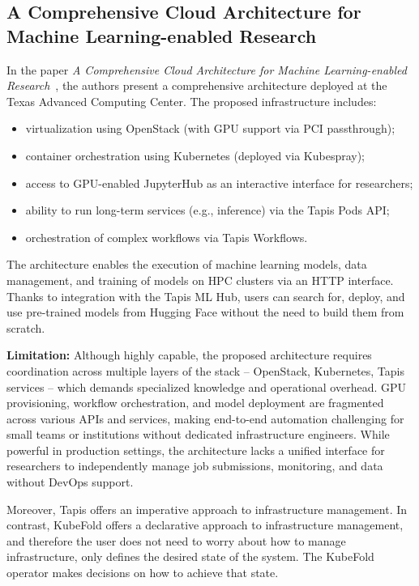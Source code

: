 \subsection{A Comprehensive Cloud Architecture for Machine Learning-enabled Research}

In the paper \textit{A Comprehensive Cloud Architecture for Machine Learning-enabled Research}~\cite{cloud_architecture_for_research}, the authors present a comprehensive architecture deployed at the Texas Advanced Computing Center.
The proposed infrastructure includes:
\begin{itemize}
    \item virtualization using OpenStack (with GPU support via PCI passthrough);
    \item container orchestration using Kubernetes (deployed via Kubespray);
    \item access to GPU-enabled JupyterHub as an interactive interface for researchers;
    \item ability to run long-term services (e.g., inference) via the Tapis Pods API;
    \item orchestration of complex workflows via Tapis Workflows.
\end{itemize}

The architecture enables the execution of machine learning models, data management, and training of models on HPC clusters via an HTTP interface.
Thanks to integration with the Tapis ML Hub, users can search for, deploy, and use pre-trained models from Hugging Face without the need to build them from scratch.

\textbf{Limitation:} Although highly capable, the proposed architecture requires coordination across multiple layers of the stack -- OpenStack, Kubernetes, Tapis services -- which demands specialized knowledge and operational overhead.
GPU provisioning, workflow orchestration, and model deployment are fragmented across various APIs and services, making end-to-end automation challenging for small teams or institutions without dedicated infrastructure engineers.
While powerful in production settings, the architecture lacks a unified interface for researchers to independently manage job submissions, monitoring, and data without DevOps support.

Moreover, Tapis offers an imperative approach to infrastructure management. In contrast, KubeFold offers a declarative approach to infrastructure management, and therefore the user does not need to worry about how to manage infrastructure, only defines the desired state of the system. The KubeFold operator makes decisions on how to achieve that state.

